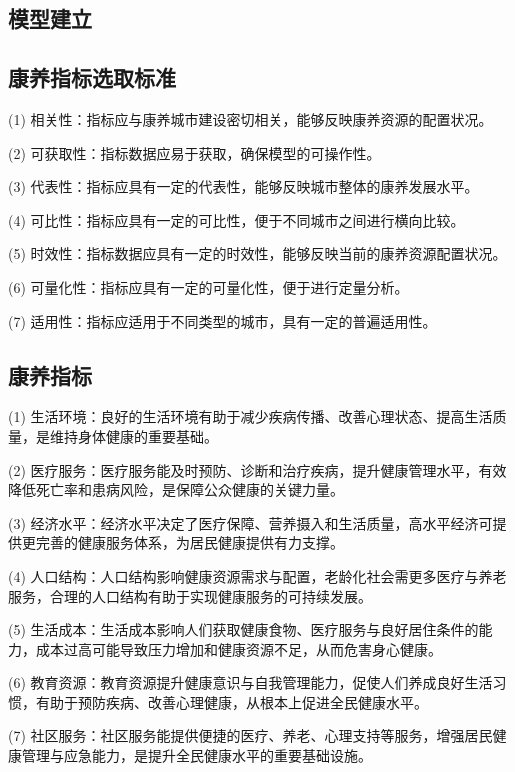 \documentclass[12pt,a4paper]{article}
\begin{document}
\begin{multicols}{2}

\section{模型建立}

\subsection{康养指标选取标准}

(1) 相关性：指标应与康养城市建设密切相关，能够反映康养资源的配置状况。

(2) 可获取性：指标数据应易于获取，确保模型的可操作性。

(3) 代表性：指标应具有一定的代表性，能够反映城市整体的康养发展水平。

(4) 可比性：指标应具有一定的可比性，便于不同城市之间进行横向比较。

(5) 时效性：指标数据应具有一定的时效性，能够反映当前的康养资源配置状况。

(6) 可量化性：指标应具有一定的可量化性，便于进行定量分析。

(7) 适用性：指标应适用于不同类型的城市，具有一定的普遍适用性。

\subsection{康养指标}

(1) 生活环境：良好的生活环境有助于减少疾病传播、改善心理状态、提高生活质量，是维持身体健康的重要基础。

(2) 医疗服务：医疗服务能及时预防、诊断和治疗疾病，提升健康管理水平，有效降低死亡率和患病风险，是保障公众健康的关键力量。

(3) 经济水平：经济水平决定了医疗保障、营养摄入和生活质量，高水平经济可提供更完善的健康服务体系，为居民健康提供有力支撑。

(4) 人口结构：人口结构影响健康资源需求与配置，老龄化社会需更多医疗与养老服务，合理的人口结构有助于实现健康服务的可持续发展。

(5) 生活成本：生活成本影响人们获取健康食物、医疗服务与良好居住条件的能力，成本过高可能导致压力增加和健康资源不足，从而危害身心健康。

(6) 教育资源：教育资源提升健康意识与自我管理能力，促使人们养成良好生活习惯，有助于预防疾病、改善心理健康，从根本上促进全民健康水平。

(7) 社区服务：社区服务能提供便捷的医疗、养老、心理支持等服务，增强居民健康管理与应急能力，是提升全民健康水平的重要基础设施。


\end{multicols}
\end{document}
